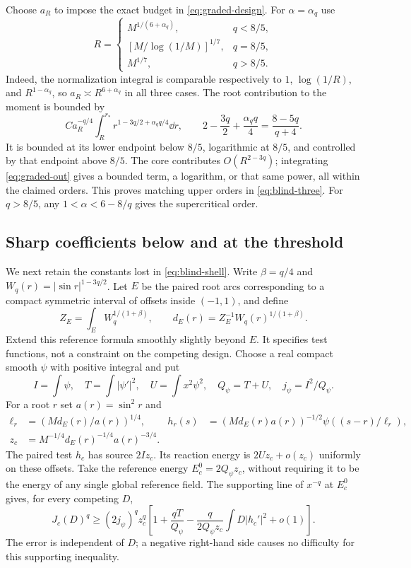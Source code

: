 Choose $a_R$ to impose the exact budget in \eqref{eq:graded-design}.
For $\alpha=\alpha_q$ use
\begin{equation}\label{eq:graded-cutoffs}
 R=\begin{cases}
 M^{1/(6+\alpha_q)},&q<8/5,\\
 [M/\log(1/M)]^{1/7},&q=8/5,\\
 M^{1/7},&q>8/5.
 \end{cases}
\end{equation}
Indeed, the normalization integral is comparable respectively to
$1$, $\log(1/R)$, and $R^{1-\alpha_q}$, so
$a_R\asymp R^{6+\alpha_q}$ in all three cases.
The root contribution to the moment is bounded by
\begin{equation}\label{eq:graded-integral}
 Ca_R^{-q/4}\int_R^{r_*}r^{1-3q/2+\alpha_q q/4}\dd r,
 \qquad
 2-\frac{3q}{2}+\frac{\alpha_q q}{4}
       =\frac{8-5q}{q+4}.
\end{equation}
It is bounded at its lower endpoint below $8/5$, logarithmic at
$8/5$, and controlled by that endpoint above $8/5$.
The core contributes $O(R^{2-3q})$; integrating
\eqref{eq:graded-out} gives a bounded term, a logarithm, or that same
power, all within the claimed orders. This proves matching upper
orders in \eqref{eq:blind-three}. For $q>8/5$, any
$1<\alpha<6-8/q$ gives the supercritical order.

\subsection{Sharp coefficients below and at the threshold}
We next retain the constants lost in \eqref{eq:blind-shell}.
Write $\beta=q/4$ and $W_q(r)=|\sin r|^{1-3q/2}$.
Let $E$ be the paired root arcs corresponding to a compact symmetric
interval of offsets inside $(-1,1)$, and define
\[
 Z_E=\int_E W_q^{1/(1+\beta)},\qquad
 d_E(r)=Z_E^{-1}W_q(r)^{1/(1+\beta)}.
\]
Extend this reference formula smoothly slightly beyond $E$. It
specifies test functions, not a constraint on the competing design.
Choose a real compact smooth $\psi$ with positive integral and put
\[
 I=\int\psi,\quad T=\int|\psi'|^2,\quad
 U=\int x^2\psi^2,\quad Q_\psi=T+U,\quad j_\psi=I^2/Q_\psi.
\]
For a root $r$ set $a(r)=\sin^2r$ and
\begin{align*}
 \ell_r&=(Md_E(r)/a(r))^{1/4},&
 h_r(s)&=(Md_E(r)a(r))^{-1/2}\psi((s-r)/\ell_r),\\
 z_c&=M^{-1/4}d_E(r)^{-1/4}a(r)^{-3/4}.
\end{align*}
The paired test $h_c$ has source $2Iz_c$. Its reaction energy is
$2Uz_c+o(z_c)$ uniformly on these offsets. Take the reference energy
$E_c^0=2Q_\psi z_c$, without requiring it to be the energy of any
single global reference field. The supporting line of $x^{-q}$ at
$E_c^0$ gives, for every competing $D$,
\begin{equation}\label{eq:sharp-tangent}
 J_c(D)^q\ge(2j_\psi)^qz_c^q
 \left[1+\frac{qT}{Q_\psi}
 -\frac{q}{2Q_\psi z_c}\int D|h_c'|^2+o(1)\right].
\end{equation}
The error is independent of $D$; a negative right-hand side causes
no difficulty for this supporting inequality.

